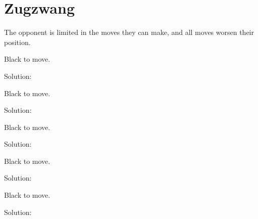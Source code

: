 \documentclass{book}
\begin{document}
\section{Zugzwang}
The opponent is limited in the moves they can make, and all moves worsen their position.\begin{multicols}{2} 
\begin{samepage} 
\newgame 


 
\showboard
 
 Black to move. 
 
Solution: 
 
\end{samepage}\begin{samepage} 
\newgame 


 
\showboard
 
 Black to move. 
 
Solution: 
 
\end{samepage}\begin{samepage} 
\newgame 


 
\showboard
 
 Black to move. 
 
Solution: 
 
\end{samepage}\begin{samepage} 
\newgame 


 
\showboard
 
 Black to move. 
 
Solution: 
 
\end{samepage}\begin{samepage} 
\newgame 


 
\showboard
 
 Black to move. 
 
Solution: 
 
\end{samepage}\end{multicols} 
\end{document}
